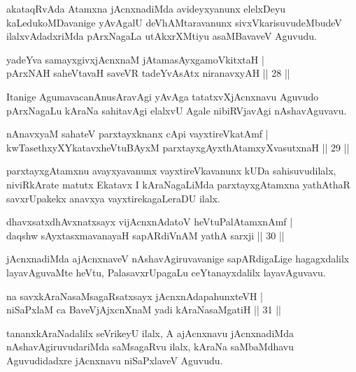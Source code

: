 \begin{artha}
akataqRvAda Atamxna jAcnxnadiMda avideyxyanunx elelxDeyu kaLedukoMDavanige yAvAgalU deVhAMtaravanunx sivxVkarisuvudeMbudeV ilalxvAdadxriMda pArxNagaLa utAkxrXMtiyu asaMBavaveV Aguvudu.
\end{artha}

\begin{shl}
yadeYva samayxgivxjAcnxnaM jAtamasAyx\s \s gamoVkitxtaH |\\
pArxNAH saheVtavaH saveVR tadeYvAsAtx niranavxyAH \hfill || 28 ||
\end{shl}

\begin{artha}
Itanige AgumavacanAnusAravAgi yAvAga tatatxvXjAcnxnavu Aguvudo pArxNagaLu kAraNa sahitavAgi elalxvU Agale nibiRVjavAgi nAshavAguvavu.
\end{artha}

\begin{shl}
nAnavxyaM sahateV parxtayxknanx cApi vayxtireVkatAmf |\\
kwTasethxyXYkatavxheVtuBAyxM parxtayxgAyxthAtamxyXvasutxnaH \hfill || 29 ||
\end{shl}

\begin{artha}
parxtayxgAtamxnu avayxyavanunx vayxtireVkavanunx kUDa sahisuvudilalx, niviRkArate matutx Ekatavx I kAraNagaLiMda parxtayxgAtamxna yathAthaR savxrUpakekx anavxya vayxtirekagaLeraDU ilalx.
\end{artha}


\begin{shl}
dhavxsatxdhAvxnatxsayx vijAcnxnAdatoV heVtuPalAtamxnAmf |\\
daqshw sAyxtasxmavanayaH sapARdiVnAM yathA sarxji \hfill || 30 ||
\end{shl}

\begin{artha}
jAcnxnadiMda ajAcnxnaveV nAshavAgiruvavanige  sapARdigaLige hagagxdalilx layavAguvaMte heVtu, PalasavxrUpagaLu ceYtanayxdalilx 
layavAguvavu.
\end{artha}

\begin{shl}
na savxkAraNasaMsagaRsatxsayx jAcnxnAdapahunxteVH |\\
niSaPxlaM ca BaveVjAjxcnXnaM yadi kAraNasaMgatiH \hfill || 31 ||
\end{shl}

\begin{artha}
tananxkAraNadalilx seVrikeyU ilalx, A  ajAcnxnavu jAcnxnadiMda 
nAshavAgiruvudariMda saMsagaRvu ilalx, kAraNa saMbaMdhavu Aguvudidadxre jAcnxnavu 
niSaPxlaveV Aguvudu.
\end{artha}

